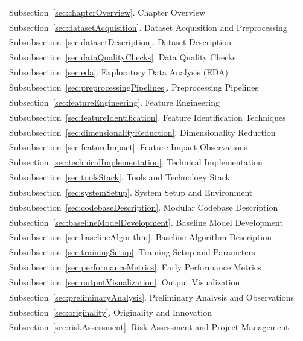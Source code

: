 \documentclass[10pt]{article}
\begin{document}
\begin{margintable}\vspace{1.4in}\footnotesize
\begin{tabularx}{\marginparwidth}{|X}
  Subsection~\ref{sec:chapterOverview}. Chapter Overview\\
  Subsection~\ref{sec:datasetAcquisition}. Dataset Acquisition and Preprocessing\\
  Subsubsection~\ref{sec:datasetDescription}. Dataset Description\\
  Subsubsection~\ref{sec:dataQualityChecks}. Data Quality Checks\\
  Subsubsection~\ref{sec:eda}. Exploratory Data Analysis (EDA)\\
  Subsubsection~\ref{sec:preprocessingPipelines}. Preprocessing Pipelines\\
  Subsection~\ref{sec:featureEngineering}. Feature Engineering\\
  Subsubsection~\ref{sec:featureIdentification}. Feature Identification Techniques\\
  Subsubsection~\ref{sec:dimensionalityReduction}. Dimensionality Reduction\\
  Subsubsection~\ref{sec:featureImpact}. Feature Impact Observations\\
  Subsection~\ref{sec:technicalImplementation}. Technical Implementation\\
  Subsubsection~\ref{sec:toolsStack}. Tools and Technology Stack\\
  Subsubsection~\ref{sec:systemSetup}. System Setup and Environment\\
  Subsubsection~\ref{sec:codebaseDescription}. Modular Codebase Description\\
  Subsection~\ref{sec:baselineModelDevelopment}. Baseline Model Development\\
  Subsubsection~\ref{sec:baselineAlgorithm}. Baseline Algorithm Description\\
  Subsubsection~\ref{sec:trainingSetup}. Training Setup and Parameters\\
  Subsubsection~\ref{sec:performanceMetrics}. Early Performance Metrics\\
  Subsubsection~\ref{sec:outputVisualization}. Output Visualization\\
  Subsection~\ref{sec:preliminaryAnalysis}. Preliminary Analysis and Observations\\
  Subsection~\ref{sec:originality}. Originality and Innovation\\
  Subsection~\ref{sec:riskAssessment}. Risk Assessment and Project Management\\

\end{tabularx}
\end{margintable}
\end{document}
